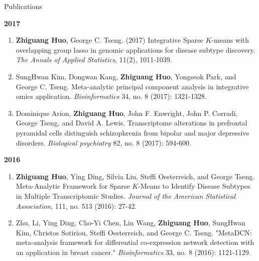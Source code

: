 \documentclass{resume} %
\begin{document}
\begin{rSection}{Publications}
\begin{enumerate}[noitemsep,topsep=0pt, resume]
\end{enumerate}

\textbf{2017}
\begin{enumerate}[noitemsep,topsep=0pt, resume]

\item {\bf Zhiguang Huo}, George C. Tseng. (2017)
    Integrative Sparse $K$-means with overlapping group lasso in genomic applications for disease subtype discovery.
    \emph{The Annals of Applied Statistics}, 11(2), 1011-1039.

\item 
SungHwan Kim, Dongwan Kang, {\bf Zhiguang Huo}, Yongseok Park, and George C. Tseng. 
Meta-analytic principal component analysis in integrative omics application. 
\emph{Bioinformatics} 34, no. 8 (2017): 1321-1328.


\item  
Dominique Arion, {\bf Zhiguang Huo}, John F. Enwright, John P. Corradi, George Tseng, and David A. Lewis. Transcriptome alterations in prefrontal pyramidal cells distinguish schizophrenia from bipolar and major depressive disorders. \emph{Biological psychiatry} 82, no. 8 (2017): 594-600.





\end{enumerate}

\textbf{2016}
\begin{enumerate}[noitemsep,topsep=0pt,resume]

 \item  {\bf Zhiguang Huo}, Ying Ding, Silvia Liu, Steffi Oesterreich, and George Tseng. Meta-Analytic Framework for Sparse $K$-Means to Identify Disease Subtypes in Multiple Transcriptomic Studies. \emph{Journal of the American Statistical Association},  111, no. 513 (2016): 27-42.

\item 
Zhu, Li, Ying Ding, Cho-Yi Chen, Lin Wang,  {\bf Zhiguang Huo}, SungHwan Kim, Christos Sotiriou, Steffi Oesterreich, and George C. Tseng. "MetaDCN: meta-analysis framework for differential co-expression network detection with an application in breast cancer." \emph{Bioinformatics} 33, no. 8 (2016): 1121-1129.




\end{enumerate}



\end{rSection}
\end{document}
